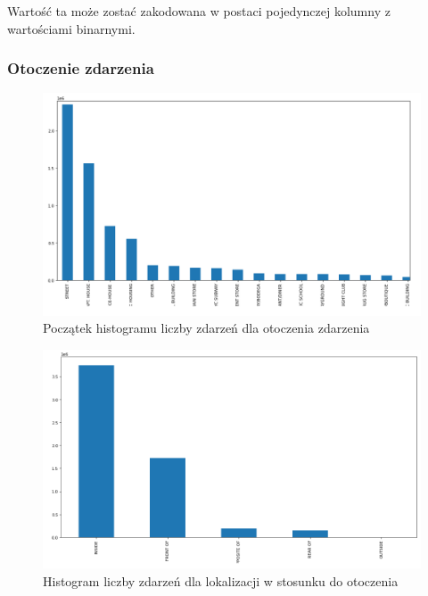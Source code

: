 \documentclass{classrep}
\begin{document}
{{{                Wartość ta może zostać zakodowana w postaci pojedynczej kolumny z wartościami binarnymi.
            }

            \subsubsection{Otoczenie zdarzenia} {
                \begin{figure}[!htbp]
                    \centering
                    \includegraphics[width=\textwidth]{img/hist_prem.png}
                    \caption{Początek histogramu liczby zdarzeń dla otoczenia zdarzenia}
                    \label{hist_prem}
                \end{figure}
                \begin{figure}[!htbp]
                    \centering
                    \includegraphics[width=\textwidth]{img/hist_loc_prem.png}
                    \caption{Histogram liczby zdarzeń dla lokalizacji w stosunku do otoczenia}
                    \label{hist_loc_prem}
                \end{figure}
                \FloatBarrier
                
}}}
\end{document}
